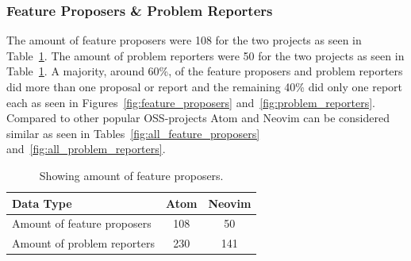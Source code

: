 \documentclass[a4paper,11pt]{article}
\begin{document}
{\subsubsection{Feature Proposers \& Problem Reporters}
The amount of feature proposers were 108 for the two projects as seen in Table~\ref{tab:other_contributors}. The amount of problem reporters were 50 for the two projects as seen in Table~\ref{tab:other_contributors}. A majority, around 60\%, of the feature proposers and problem reporters did more than one proposal or report and the remaining 40\% did only one report each as seen in Figures~\ref{fig:feature_proposers} and~\ref{fig:problem_reporters}. Compared to other popular OSS-projects Atom and Neovim can be considered similar as seen in Tables~\ref{fig:all_feature_proposers} and~\ref{fig:all_problem_reporters}.
\begin{table}[h]
	\centering
	\begin{tabular}{ | l | c | c |}
		\hline
		\textbf{Data Type} 			& \textbf{Atom} 	& \textbf{Neovim}	\\\hline
		Amount of feature proposers	& 108		& 50		 		\\\hline
		Amount of problem reporters	& 230		& 141		 	\\
		\hline
	\end{tabular}
	\caption{Showing amount of feature proposers.}
	\label{tab:other_contributors}
\end{table}

}
\end{document}
